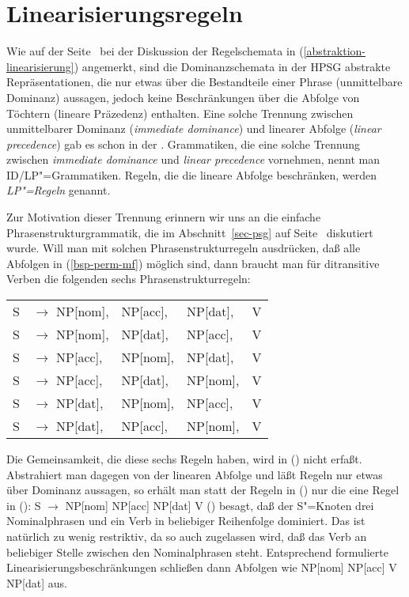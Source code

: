 \section{Linearisierungsregeln}

Wie auf der Seite~\pageref{abstraktion-linearisierung} bei der Diskussion der Regelschemata in
(\ref{abstraktion-linearisierung}) angemerkt, sind die Dominanzschemata in der HPSG abstrakte
Repräsentationen, die nur etwas über die Bestandteile einer Phrase (unmittelbare Dominanz)
aussagen, jedoch keine Beschränkungen über die Abfolge von Töchtern (lineare Präzedenz)
enthalten. Eine solche Trennung zwischen unmittelbarer Dominanz (\emph{immediate dominance})
und linearer Abfolge (\emph{linear precedence}) gab es schon in der \gpsg
\citep*{GKPS85a}. Grammatiken, die eine solche Trennung zwischen \emph{immediate dominance} und
\emph{linear precedence} vornehmen, nennt man ID/LP"=Grammatiken. Regeln, die die lineare Abfolge
beschränken, werden \emph{LP"=Regeln} genannt.

Zur Motivation dieser Trennung erinnern wir uns an die einfache Phrasenstrukturgrammatik,
die im Abschnitt~\ref{sec-psg} auf Seite~\pageref{ditrans-ps-regeln} diskutiert wurde. Will man
mit solchen Phrasenstrukturregeln ausdrücken, daß alle Abfolgen in (\ref{bsp-perm-mf}) möglich sind,
dann braucht man für ditransitive Verben die folgenden sechs Phrasenstrukturregeln:
\ea
\begin{tabular}[t]{@{}l@{ }l@{ }l@{ }l@{ }l}
S  & $\to$ NP[nom],& NP[acc], & NP[dat], & V\\
S  & $\to$ NP[nom],& NP[dat], & NP[acc], & V\\
S  & $\to$ NP[acc],& NP[nom], & NP[dat], & V\\
S  & $\to$ NP[acc],& NP[dat], & NP[nom], & V\\
S  & $\to$ NP[dat],& NP[nom], & NP[acc], & V\\
S  & $\to$ NP[dat],& NP[acc], & NP[nom], & V\\
\end{tabular}
\z
Die Gemeinsamkeit, die diese sechs Regeln haben, wird in () nicht erfaßt. Abstrahiert man
dagegen von der linearen Abfolge und läßt Regeln nur etwas über Dominanz aussagen, so erhält man
statt der Regeln in () nur die eine Regel in ():
 \ea
S $\to$ NP[nom] NP[acc] NP[dat] V
\z
() besagt, daß der S"=Knoten drei Nominalphrasen und ein Verb in beliebiger Reihenfolge
dominiert. Das ist natürlich zu wenig restriktiv, da so auch zugelassen wird, daß das Verb an beliebiger
Stelle zwischen den Nominalphrasen steht. Entsprechend formulierte Linearisierungsbeschränkungen
schließen dann Abfolgen wie NP[nom] NP[acc] V NP[dat] aus.

